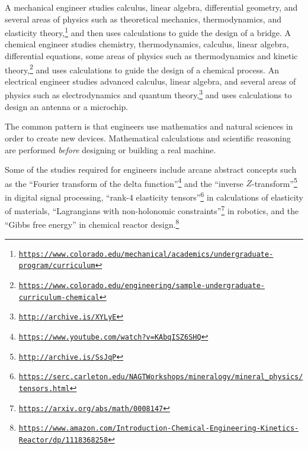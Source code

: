 A mechanical engineer studies calculus, linear algebra, differential
geometry, and several areas of physics such as theoretical mechanics,
thermodynamics, and elasticity theory,\footnote{\texttt{\href{https://www.colorado.edu/mechanical/academics/undergraduate-program/curriculum}{https://www.colorado.edu/mechanical/academics/undergraduate-program/curriculum}}}
and then uses calculations to guide the design of a bridge. A chemical
engineer studies chemistry, thermodynamics, calculus, linear algebra,
differential equations, some areas of physics such as thermodynamics
and kinetic theory,\footnote{\texttt{\href{https://www.colorado.edu/engineering/sample-undergraduate-curriculum-chemical}{https://www.colorado.edu/engineering/sample-undergraduate-curriculum-chemical}}}
and uses calculations to guide the design of a chemical process. An
electrical engineer studies advanced calculus, linear algebra, and
several areas of physics such as electrodynamics and quantum theory,\footnote{\texttt{\href{http://archive.is/XYLyE}{http://archive.is/XYLyE}}}
and uses calculations to design an antenna or a microchip.

The common pattern is that engineers use mathematics and natural sciences
in order to create new devices. Mathematical calculations and scientific
reasoning are performed \emph{before} designing or building a real
machine.

Some of the studies required for engineers include arcane abstract
concepts such as the \textsf{``}Fourier transform of the delta function\textsf{''}\footnote{\texttt{\href{https://www.youtube.com/watch?v=KAbqISZ6SHQ}{https://www.youtube.com/watch?v=KAbqISZ6SHQ}}}
and the \textsf{``}inverse $Z$-transform\textsf{''}\footnote{\texttt{\href{http://archive.is/SsJqP}{http://archive.is/SsJqP}}}
in digital signal processing, \textsf{``}rank-4 elasticity tensors\textsf{''}\footnote{\texttt{\href{https://serc.carleton.edu/NAGTWorkshops/mineralogy/mineral_physics/tensors.html}{https://serc.carleton.edu/NAGTWorkshops/mineralogy/mineral\_physics/tensors.html}}}
in calculations of elasticity of materials, \textsf{``}Lagrangians with non-holonomic
constraints\textsf{''}\footnote{\texttt{\href{https://arxiv.org/abs/math/0008147}{https://arxiv.org/abs/math/0008147}}}
in robotics, and the \textsf{``}Gibbs free energy\textsf{''} in chemical reactor design.\footnote{\texttt{\href{https://www.amazon.com/Introduction-Chemical-Engineering-Kinetics-Reactor/dp/1118368258}{https://www.amazon.com/Introduction-Chemical-Engineering-Kinetics-Reactor/dp/1118368258}}}

